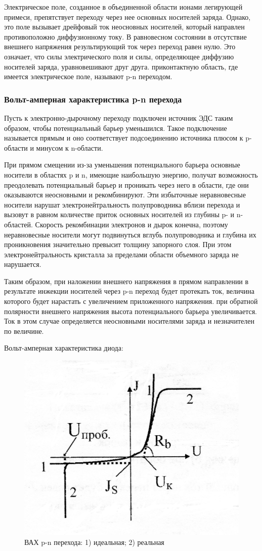 Электрическое поле, созданное в объединенной области ионами легирующей примеси, препятствует переходу через нее основных носителей заряда. Однако, это поле вызывает дрейфовый ток неосновных носителей, который направлен противоположно диффузионному току. В равновесном состоянии в отсутствие внешнего напряжения результирующий ток через переход равен нулю. Это означает, что силы электрического поля и силы, определяющее диффузию носителей заряда, уравновешивают друг друга. приконтактную область, где имеется электрическое поле, называют p-n переходом.

\subsubsection{Вольт-амперная характеристика p-n перехода}
Пусть к электронно-дырочному переходу подключен источник ЭДС таким образом, чтобы потенциальный барьер уменьшился. Такое подключение называется прямым и оно соответствует подсоединению источника плюсом к p-области и минусом к n-области. 

При прямом смещении из-за уменьшения потенциального барьера основные носители в областях p и n, имеющие наибольшую энергию, получат возможность преодолевать потенциальный барьер и проникать через него в области, где они оказываются неосновными и рекомбинируют. Эти избыточные неравновесные носители нарушат электронейтральность полупроводника вблизи перехода и вызовут в равном количестве приток основных носителей из глубины p- и n-областей. Скорость рекомбинации электронов и дырок конечна, поэтому неравновесные носители могут подвинуться вглубь полупроводника и глубина их проникновения значительно превысит толщину запорного слоя. При этом электронейтральность кристалла за пределами области объемного заряда не нарушается. 

Таким образом, при наложении внешнего напряжения в прямом направлении в результате инжекции  носителей через p-n переход будет протекать ток, величина которого будет нарастать с увеличением приложенного напряжения. при обратной полярности внешнего напряжения высота потенциального барьера увеличивается. Ток в этом случае определяется неосновными носителями заряда и незначителен по величине.

Вольт-амперная характеристика диода:
\begin{figure}[h!]
	\centering
	\includegraphics[width=0.5\linewidth]{imgs/fig2.jpg}
	\caption{ВАХ p-n перехода: 1) идеальная; 2) реальная}
	\label{fig:2}
\end{figure}

